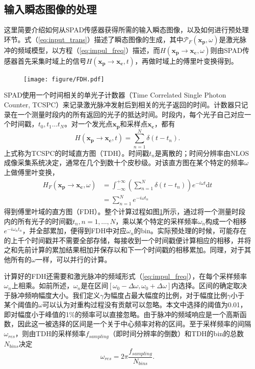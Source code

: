 \documentclass[master]{shtthesis}             %
\begin{document}
\subsection{输入瞬态图像的处理}

这里简要介绍如何从SPAD传感器获得所需的输入瞬态图像，以及如何进行预处理环节。式（\ref{eq:input_trans}）描述了瞬态图像的生成，其中$\mathcal{P}_F(\mathbf{x_p},\omega)$是激光脉冲的频域模型，以方程（\ref{eq:impul_freq}）描述，而$H(\mathbf{x_p}\rightarrow \mathbf{x_c},\omega)$则由SPAD传感器首先采集时域上的信号$H(\mathbf{x_p}\rightarrow \mathbf{x_c},t)$，再做时域上的傅里叶变换得到。

\begin{figure}[!tb]
  \centering
  \texttt{[image: figure/FDH.pdf]}
  \label{fig:fdh}
\end{figure}

SPAD使用一个时间相关的单光子计数器（Time Correlated Single Photon Counter, TCSPC）来记录激光脉冲发射后到相关的光子返回的时间。计数器只记录在一个测量时段内的所有返回的光子的抵达时间。时段内，每个光子自己对应一个时间戳，$t_0, t_1\dots t_N$。对一个发光点$\mathbf{x_p}$和采样点$\mathbf{x_c}$，都有
\begin{equation}
  H(\mathbf{x_p}\rightarrow \mathbf{x_c},t) = \sum_{n=1}^N \delta(t-t_n).
\end{equation}
上式称为TCSPC的时域直方图（TDH）。时间戳$t_n$是离散的；时间分辨率由NLOS成像采集系统决定，通常在几个到数十个皮秒级。对该直方图在某个特定的频率$\omega$上做傅里叶变换，
\begin{equation}
  \begin{split}
    H_F(\mathbf{x_p}\rightarrow \mathbf{x_c},\omega) &= \int_{-\infty}^{+\infty} \left( \sum_{n=1}^N \delta(t-t_n) \right) e^{-i\omega t} \text{d}t \\
    &= \sum_{n=1}^N e^{-i\omega t_n}
  \end{split}
\end{equation}
得到傅里叶域的直方图（FDH）。整个计算过程如图\ref{fig:fdh}所示，通过将一个测量时段内的所有光子的时间戳$t_n, n=1,\dots,N$，乘以某个特定的采样频率$\omega_n$构成一个相移$e^{-i\omega_n t_n}$，并全部累加，便得到FDH中对应$\omega_n$的bin。实际预处理的时候，可能存在的上千个时间戳并不需要全部存储，每接收到一个时间戳便计算相应的相移，并将之和先前计算的累加结果相加并保存以和下一个时间戳的相移累加。同理，对于其他所有的$\omega$一样，可以并行的计算。

计算好的FDH还需要和激光脉冲的频域形式（\ref{eq:impul_freq}），在每个采样频率$\omega_n$上相乘。如前所述，$\omega_n$是在区间$[\omega_0-\Delta\omega,\omega_0+\Delta\omega]$内选择。区间的确定取决于脉冲频响幅度大小。我们定义$\gamma$为幅度占最大幅度的比例，对于幅度比例$\gamma$小于某个阈值的$\omega$可以认为对重构过程没有贡献可以忽略。本文中选择的阈值为0.01，即对幅度小于峰值的1\%的频率可以直接忽略。由于脉冲的频域响应是一个高斯函数，因此这一被选择的区间是一个关于中心频率对称的区间。至于采样频率的间隔$\omega_{res}$，则由TDH的采样频率$f_{sampling}$（即时间分辨率的倒数）和TDH的bin的总数$N_{bins}$决定
\begin{equation}
  \omega_{res} = 2\pi \frac{f_{sampling}}{N_{bins}}.
\end{equation}
\end{document}
